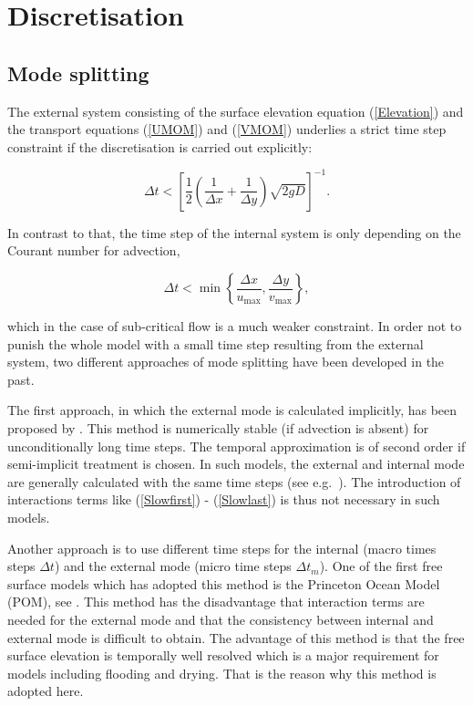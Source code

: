 \section{Discretisation}\label{Section_discretisation}

\subsection{Mode splitting}\label{Section_mode_splitting}

The external system consisting of the surface elevation equation
(\ref{Elevation}) and the transport equations (\ref{UMOM}) and
(\ref{VMOM}) underlies a strict time step constraint if the
discretisation is carried out explicitly:

\begin{equation}\label{CourantSurf}
\Delta t < \left[\frac12 \left(\frac{1}{\Delta x}+\frac{1}{\Delta y}\right)
\sqrt{2gD}\right]^{-1}.
\end{equation}

In contrast to that, the time step of the internal system
is only depending on the Courant number for advection,

\begin{equation}\label{CourantVel}
\Delta t < \min\left\{\frac{\Delta x}{u_{\max}},\frac{\Delta y}{v_{\max}}
\right\},
\end{equation}

which in the case of sub-critical flow is a much weaker
constraint. In order not to punish the whole model with a small
time step resulting from the external system, two different approaches
of mode splitting have been developed in the past.

The first approach, in which the external mode is calculated
implicitly, has been proposed by \cite{MADALAea77}.
This method
is numerically stable (if advection is absent)
for unconditionally long time steps.
The temporal approximation is of second order if semi-implicit
treatment is chosen. In such models, the external and internal mode are
generally calculated with the same time steps
(see e.g.\ \cite{BACKHAUS85}). The introduction of
interactions terms like (\ref{Slowfirst})
- (\ref{Slowlast}) is thus not necessary in such models.

Another approach is to use different time steps for the internal
(macro times steps $\Delta t$)
and the external mode \label{dtm} (micro time steps $\Delta t_m$).
One of the first free surface models which has adopted this method is the
Princeton Ocean Model (POM), see \cite{BLUMBERGea87}.
This method has the disadvantage that interaction
terms are needed for the external mode and that the consistency
between internal and external mode is difficult to obtain.
The advantage of this method is that the free surface elevation is
temporally well resolved which is a major requirement for models
including flooding and drying. That is the reason why this
method is adopted here.

